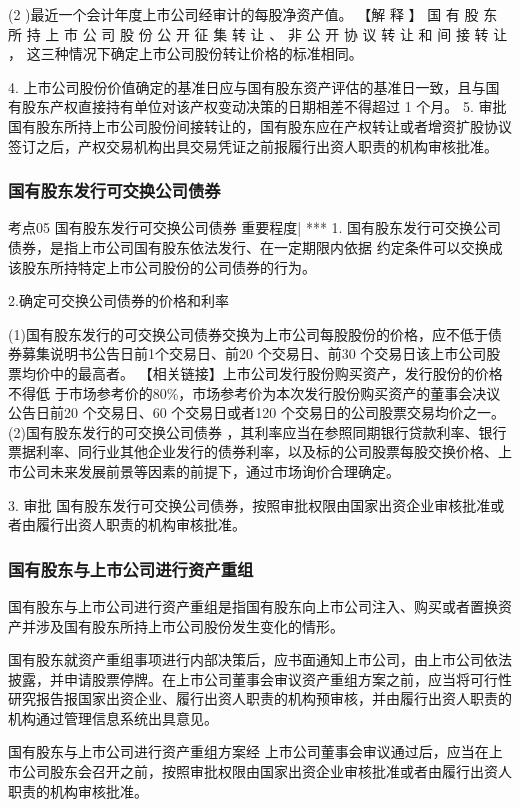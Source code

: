\documentclass[UTF8,12pt]{ctexart}
\numberwithin{equation}{section} %
\numberwithin{figure}{section}
\numberwithin{table}{section}
\begin{document}
	(2 )最近一个会计年度上市公司经审计的每股净资产值。
	【解 释 】 国 有 股 东 所 持 上 市 公 司 股 份 公 开 征 集 转 让 、 非 公 开 协 议 转 让 和 间 接 转 让 ， 这三种情况下确定上市公司股份转让价格的标准相同。
	
	4. 上市公司股份价值确定的基准日应与国有股东资产评估的基准日一致，且与国有股东产权直接持有单位对该产权变动决策的日期相差不得超过 1 个月。
	5. 审批
	国有股东所持上市公司股份间接转让的，国有股东应在产权转让或者增资扩股协议签订之后，产权交易机构出具交易凭证之前报履行出资人职责的机构审核批准。
	
	\subsubsection{国有股东发行可交换公司债券}
	考点05 国有股东发行可交换公司债券 重要程度| ***
	1. 国有股东发行可交换公司债券，是指上市公司国有股东依法发行、在一定期限内依据
	约定条件可以交换成该股东所持特定上市公司股份的公司债券的行为。
	
	2.确定可交换公司债券的价格和利率
	
	(1)国有股东发行的可交换公司债券交换为上市公司每股股份的价格，应不低于债券募集说明书公告日前1个交易日、前20 个交易日、前30 个交易日该上市公司股票均价中的最高者。
	【相关链接】上市公司发行股份购买资产，发行股份的价格不得低 于市场参考价的80\%，市场参考价为本次发行股份购买资产的董事会决议公告日前20 个交易日、60 个交易日或者120 个交易日的公司股票交易均价之一。
	(2)国有股东发行的可交换公司债券 ，其利率应当在参照同期银行贷款利率、银行票据利率、同行业其他企业发行的债券利率，以及标的公司股票每股交换价格、上市公司未来发展前景等因素的前提下，通过市场询价合理确定。
	
	3. 审批
	国有股东发行可交换公司债券，按照审批权限由国家出资企业审核批准或者由履行出资人职责的机构审核批准。
	
	\subsubsection{国有股东与上市公司进行资产重组}
	国有股东与上市公司进行资产重组是指国有股东向上市公司注入、购买或者置换资产并涉及国有股东所持上市公司股份发生变化的情形。
	
	国有股东就资产重组事项进行内部决策后，应书面通知上市公司，由上市公司依法披露，并申请股票停牌。在上市公司董事会审议资产重组方案之前，应当将可行性研究报告报国家出资企业、履行出资人职责的机构预审核，并由履行出资人职责的机构通过管理信息系统出具意见。
	
	国有股东与上市公司进行资产重组方案经 上市公司董事会审议通过后，应当在上市公司股东会召开之前，按照审批权限由国家出资企业审核批准或者由履行出资人职责的机构审核批准。
	
\end{document}
